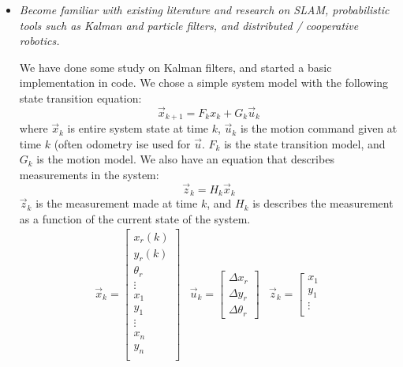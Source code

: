 \documentclass[11pt]{article}
\begin{document}
\begin{itemize}
    \item \emph{Become familiar with existing literature and research on SLAM, probabilistic tools such as Kalman and particle filters, and distributed / cooperative robotics.}

        We have done some study on Kalman filters, and started a basic implementation in code. We chose a simple system model with the following state transition equation:
        $$\vec{x}_{k+1} = F_k x_k + G_k \vec{u}_k$$
        where $\vec{x}_k$ is entire system state at time $k$, $\vec{u}_k$ is the motion command given at time $k$ (often odometry ise used for $\vec{u}$. $F_k$ is the state transition model, and $G_k$ is the motion model. We also have an equation that describes measurements in the system:
        $$\vec{z}_k = H_k \vec{x}_k$$
        $\vec{z}_k$ is the measurement made at time $k$, and $H_k$ is describes the measurement as a function of the current state of the system.
        \[ 
        \begin{array}{ccc}
            \vec{x}_k = 
            \left[
                \begin{array}{c} 
                    x_r(k) \\
                    y_r(k) \\
                    \theta_r \\
                    \vdots \\
                    x_1 \\
                    y_1 \\
                    \vdots \\
                    x_n \\
                    y_n \\
                \end{array}
            \right] &  
            \vec{u}_k = 
            \left[
                \begin{array}{c} 
                    \Delta x_r \\
                    \Delta y_r \\
                    \Delta \theta_r
                \end{array}
            \right] &  
            \vec{z}_k = 
            \left[
                \begin{array}{c} 
                    x_1 \\
                    y_1 \\
                    \vdots \\

\end{array}
\end{array}\]
\end{itemize}
\end{document}
